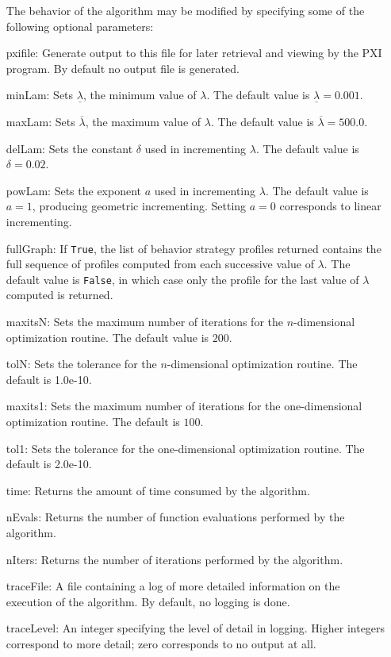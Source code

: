 \begin{itemize}
The behavior of the algorithm may be modified by specifying some of the
following optional parameters:
\bd
\item
[pxifile:] Generate output to this file for later retrieval and viewing by
the PXI program.  By default no output file is generated.
\item
[minLam:] Sets $\underline{\lambda}$, the minimum value of $\lambda$.  The 
default value is $\underline{\lambda}=0.001$.
\item
[maxLam:] Sets $\overline{\lambda}$, the maximum value of $\lambda$.  The
default value is $\overline{\lambda}=500.0$.
\item
[delLam:] Sets the constant $\delta$ used in incrementing $\lambda$.  The
default value is $\delta=0.02$.
\item
[powLam:] Sets the exponent $a$ used in incrementing $\lambda$.  The default
value is $a=1$, producing geometric incrementing.  Setting $a=0$ corresponds
to linear incrementing.
\item
[fullGraph:] If \verb+True+, the list of behavior strategy profiles
returned contains the full sequence of profiles computed from each successive
value of $\lambda$.  The default value is \verb+False+, in which case only
the profile for the last value of $\lambda$ computed is returned.
\item
[maxitsN:] Sets the maximum number of iterations for the $n$-dimensional
optimization routine.  The default value is $200$.
\item
[tolN:] Sets the tolerance for the $n$-dimensional optimization routine.
The default is 1.0e-10.
\item
[maxits1:] Sets the maximum number of iterations for the one-dimensional
optimization routine.  The default is $100$.
\item
[tol1:] Sets the tolerance for the one-dimensional optimization routine.
The default is 2.0e-10.
\item
[time:] Returns the amount of time consumed by the
algorithm.
\item
[nEvals:] Returns the number of function evaluations
performed by the algorithm.
\item
[nIters:] Returns the number of iterations performed
by the algorithm.
\item
[traceFile:] A file containing a log of more detailed information on
the execution of the algorithm.  By default, no logging is done.
\item
[traceLevel:] An integer specifying the level of detail in logging.
Higher integers correspond to more detail; zero corresponds to
no output at all.
\ed


\end{itemize}
